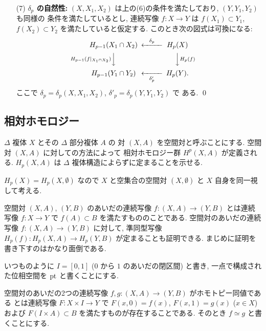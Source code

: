\documentclass[12pt,twoside]{jarticle}
\begin{document}
\begin{theorem}[ホモロジー群の基本性質]
\begin{enumerate}
  \item[(7)] {\bf $\delta_p$ の自然性:}
    $(X,X_1,X_2)$ は上の(6)の条件を満たしており, $(Y,Y_1,Y_2)$ も同様の
    条件を満たしているとし, 連続写像 $f:X\to Y$ は $f(X_1)\subset Y_1$, %
    $f(X_2)\subset Y_2$ を満たしていると仮定する. 
    このとき次の図式は可換になる:
    \begin{equation*}
    \begin{CD}
      H_{p-1}(X_1\cap X_2) @<\delta_p<< H_p(X) \\
      @V{H_{p-1}(f|_{X_1\cap X_2})}VV  @VV{H_p(f)}V \\
      H_{p-1}(Y_1\cap Y_2) @<<\delta'_p< H_p(Y). \\
    \end{CD}
    \end{equation*}
    ここで $\delta_p=\delta_p(X,X_1,X_2)$, $\delta'_p=\delta_p(Y,Y_1,Y_2)$ で
    ある.
    \qed
  \end{enumerate}
\end{theorem}


\subsection{相対ホモロジー}

$\Delta$ 複体 $X$ とその $\Delta$ 部分複体 $A$ の
対 $(X,A)$ を空間対と呼ぶことにする.
空間対 $(X,A)$ に対しての方法によって
相対ホモロジー群 $H^p(X,A)$ が定義される.
$H_p(X,A)$ は $\Delta$ 複体構造によらずに定まることを示せる.

$H_p(X)=H_p(X,\emptyset)$ なので $X$ と空集合の空間対 $(X,\emptyset)$ 
と $X$ 自身を同一視して考える.

空間対 $(X,A)$, $(Y,B)$ のあいだの連続写像 $f:(X,A)\to(Y,B)$ 
とは連続写像 $f:X\to Y$ で $f(A)\subset B$ を満たすもののことである.
空間対のあいだの連続写像 $f:(X,A)\to(Y,B)$ に対して, 
準同型写像 $H_p(f):H_p(X,A)\to H_p(Y,B)$ が定まることも証明できる.
まじめに証明を書き下すのはかなり面倒である.

いつものように $I=[0,1]$ ($0$ から $1$ のあいだの閉区間) と書き,
一点で構成された位相空間を $\mathop{\mathrm{pt}}$ と書くことにする.

空間対のあいだの2つの連続写像 $f,g:(X,A)\to(Y,B)$ がホモトピー同値である
とは連続写像 $F:X\times I\to Y$ で $F(x,0)=f(x)$, $F(x,1)=g(x)$ ($x\in X$)
および $F(I\times A)\subset B$ を満たすものが存在することである.
そのとき $f\simeq g$ と書くことにする.
\end{document}
